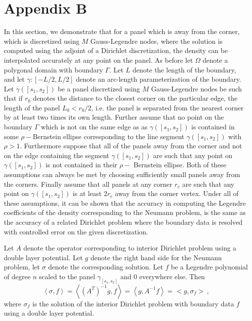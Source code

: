 \documentclass[12pt]{article}
\begin{document}
\section{Appendix B}
\label{sec:appb}
In this section, we demonstrate that for a panel which is away from the corner, which is discretized using $M$ Gauss-Legendre nodes, where the solution is computed using the adjoint of a Dirichlet discretization, the density can be interpolated 
accurately at any point on the panel. As before let $\Omega$ denote a polygonal domain with boundary $\Gamma$. Let
$L$ denote the length of the boundary, and let $\gamma: [-L/2,L/2]$ denote an arc-length parameterization of the boundary.
Let $\gamma([s_{1},s_{2}])$ be a panel discretized using $M$ Gauss-Legendre nodes be such that if $r_{0}$ denotes
the distance to the closest corner on the particular edge, the length of the panel $L_{0}<r_{0}/2$, i.e. the panel
is separated from the nearest corner by at least two times its own length. Further assume that no point on the boundary $\Gamma$ which is not on the same edge as as $\gamma([s_{1},s_{2}])$ is contained in some $\rho-$Bernstein ellipse
corresponding to the line segment $\gamma([s_{1},s_{2}])$ with $\rho>1$. Furthermore suppose that all of the panels away from the corner and not on the edge containing the segment $\gamma([s_{1},s_{2}])$ are such that any point on $\gamma([s_{1},s_{2}])$ is not contained in their $\rho-$ Bernstein ellipse.
Both of these assumptions can always be met by choosing sufficiently small panels away from the corners. Finally 
assume that all panels at any corner $r_{c}$ are such that any point on $\gamma([s_{1},s_{2}])$ is at least $2r_{c}$ 
away from the corner vertex. Under all of these assumptions, it can be shown that the accuracy in computing the
Legendre coefficients of the density corresponding to the Neumann problem, is the same as the accuracy
of a related Dirichlet problem where the boundary data is resolved with controlled error on the given discretization.

Let $A$ denote the operator corresponding to interior Dirichlet problem using a double layer potential. Let $g$ denote the
right hand side for the Neumann problem, let $\sigma$ denote the corresponding solution. Let $f$ be a Legendre polynomial of
degree $n$ scaled to the panel $\gamma_{[s_{1},s_{2}]}$ and $0$ everywhere else. Then
\begin{equation}
\left<\sigma, f \right> = \left< (A^{T})^{-1} g, f\right> = \left< g, A^{-1} f \right> = <g, \sigma_{f}> \, ,
\end{equation}
where $\sigma_{f}$ is the solution of the interior Dirichlet problem with boundary data $f$ using a double layer potential.
 
\end{document}
